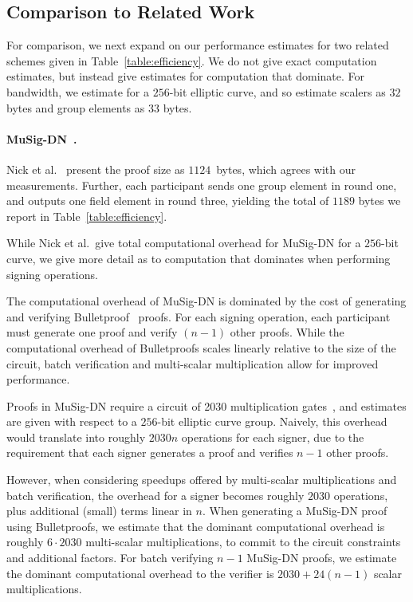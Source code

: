 \subsection{Comparison to Related Work}
\label{performance-estimates}


For comparison,
we next expand on our performance estimates for two related schemes given in Table~\ref{table:efficiency}.
We do not give exact computation estimates,
but instead give estimates for computation that dominate.
For bandwidth,
we estimate for a $256$-bit elliptic curve,
and so estimate scalers as $32$ bytes and group elements as $33$ bytes.

\paragraph{MuSig-DN~\cite{NickRSW20}.}
Nick et al.~\cite{NickRSW20} present the proof size
as $1124$~bytes, which agrees with our measurements.
Further, each participant sends one group element in round one,
and outputs one field element in round three, yielding
the total of $1189$ bytes we report in Table~\ref{table:efficiency}.

While Nick et al.\ give total computational overhead for MuSig-DN for a $256$-bit curve,
we give more detail as to computation that dominates when performing signing operations.

The computational overhead of MuSig-DN is dominated by the cost of generating and verifying Bulletproof~\cite{BunzBBPWM18} proofs.
For each signing operation,
each participant must generate one proof and verify $(n-1)$ other proofs.
While the computational overhead of Bulletproofs scales linearly relative to the size of the circuit,
batch verification and multi-scalar multiplication allow for improved performance.

Proofs in MuSig-DN require a circuit of 2030 multiplication gates~\cite{NickRSW20},
and estimates are given with respect to a $256$-bit elliptic curve group.
Naively, this overhead would translate into roughly $2030n$ operations for each signer,
due to the requirement that each signer generates a proof and verifies $n-1$ other proofs.

However, when considering speedups offered by multi-scalar multiplications and batch verification,
the overhead for a signer becomes roughly $2030$ operations,
plus additional (small) terms linear in $n$.
When generating a MuSig-DN proof using Bulletproofs,
we estimate that the dominant computational overhead is roughly $6 \cdot 2030$ multi-scalar multiplications,
to commit to the circuit constraints and additional factors.
For batch verifying $n-1$ MuSig-DN proofs,
we estimate the dominant computational overhead to the verifier is $2030 + 24(n-1)$ scalar multiplications.


